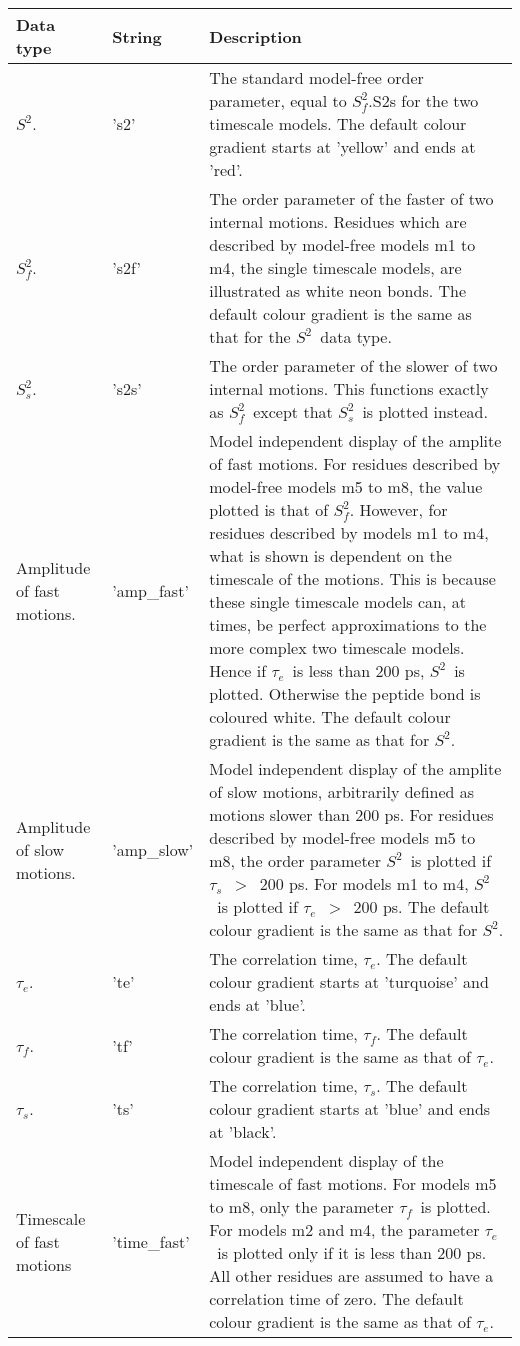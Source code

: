 \documentclass[a4paper,11pt,twoside,openright]{book}
\begin{document}
{\begin{table*}
\begin{scriptsize}
\begin{center}
\begin{tabularx}{\textwidth}{llX}
\\[-5pt]
\toprule
Data type & String & Description \\
\midrule
$S^2$. & 's2' & The standard model-free order parameter, equal to $S^2_f$.S2s for the two timescale models.  The default colour gradient starts at 'yellow' and ends at 'red'. \\
$S^2_f$. & 's2f' & The order parameter of the faster of two internal motions.  Residues which are described by model-free models m1 to m4, the single timescale models, are illustrated as white neon bonds.  The default colour gradient is the same as that for the $S^2$\  data type. \\
$S^2_s$. & 's2s' & The order parameter of the slower of two internal motions.  This functions exactly as $S^2_f$\  except that $S^2_s$\  is plotted instead. \\
Amplitude of fast motions. & 'amp\_fast' & Model independent display of the amplite of fast motions.  For residues described by model-free models m5 to m8, the value plotted is that of $S^2_f$.  However, for residues described by models m1 to m4, what is shown is dependent on the timescale of the motions.  This is because these single timescale models can, at times, be perfect approximations to the more complex two timescale models.  Hence if $\tau_e$\  is less than 200 ps, $S^2$\  is plotted.  Otherwise the peptide bond is coloured white.  The default colour gradient  is the same as that for $S^2$. \\
Amplitude of slow motions. & 'amp\_slow' & Model independent display of the amplite of slow motions, arbitrarily defined as motions slower than 200 ps.  For residues described by model-free models m5 to m8, the order parameter $S^2$\  is plotted if $\tau_s$\  $>$\  200 ps.  For models m1 to m4, $S^2$\  is plotted if $\tau_e$\  $>$\  200 ps.  The default colour gradient is the same as that for $S^2$. \\
$\tau_e$. & 'te' & The correlation time, $\tau_e$.  The default colour gradient starts at 'turquoise' and ends at 'blue'. \\
$\tau_f$. & 'tf' & The correlation time, $\tau_f$.  The default colour gradient is the same as that of $\tau_e$. \\
$\tau_s$. & 'ts' & The correlation time, $\tau_s$.  The default colour gradient starts at 'blue' and ends at 'black'. \\
Timescale of fast motions & 'time\_fast' & Model independent display of the timescale of fast motions.  For models m5 to m8, only the parameter $\tau_f$\  is plotted.  For models m2 and m4, the parameter $\tau_e$\  is plotted only if it is less than 200 ps.  All other residues are assumed to have a correlation time of zero.  The default colour gradient is the same as that of $\tau_e$. \\

\end{tabularx}
\end{center}
\end{scriptsize}
\end{table*}}
\end{document}
